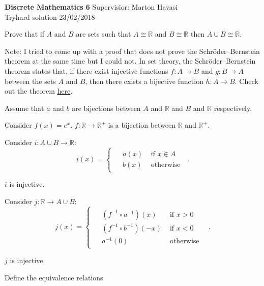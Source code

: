 \documentclass{exam}
\begin{document}
\noindent
\large\textbf{Discrete Mathematics 6} \hfill Supervisior: Marton Havasi \\
\normalsize Tryhard solution \hfill 23/02/2018

\begin{questions}

\question Prove that if $A$ and $B$ are sets such that $A \cong \mathbb{R}$ and
$B \cong \mathbb{R}$ then $A \cup B \cong \mathbb{R}$.

Note: I tried to come up with a proof that does not prove the Schröder–Bernstein theorem at the same time but I could not. In set theory, the Schröder–Bernstein theorem states that, if there exist injective functions $f : A \rightarrow B$ and $g : B \rightarrow A$ between the sets $A$ and $B$, then there exists a bijective function $h : A \rightarrow B$. Check out the theorem \href{https://en.wikipedia.org/wiki/Schr%C3%B6der%E2%80%93Bernstein_theorem}{here}.

Assume that $a$ and $b$ are bijections between $A$ and $\mathbb{R}$ and $B$ and $\mathbb{R}$ respectively.

Consider $f(x)=e^x$. $f: \mathbb{R} \rightarrow \mathbb{R}^+$ is a bijection between $\mathbb{R}$ and $\mathbb{R}^+$.

Consider $i: A\cup B \rightarrow \mathbb{R}$:
\[
  i(x) =
  \begin{cases}
    \begin{aligned}
       & a(x)  & \text{ if } x \in A  \\
    
       & b(x) & \text{ otherwise}
    \end{aligned}        
  \end{cases} \,.
\]

$i$ is injective.

Consider $j: \mathbb{R} \rightarrow A\cup B$:
\[
  j(x) =
  \begin{cases}
    \begin{aligned}
       & (f^{-1} \circ a^{-1})(x)  & \text{ if } x > 0  \\
    
       & (f^{-1} \circ b^{-1})(-x) & \text{ if } x < 0 \\
       & a^{-1}(0)  & \text{ otherwise } 
    \end{aligned}        
  \end{cases} \,.
\]

$j$ is injective.

Define the equivalence relations


\end{questions}
\end{document}
